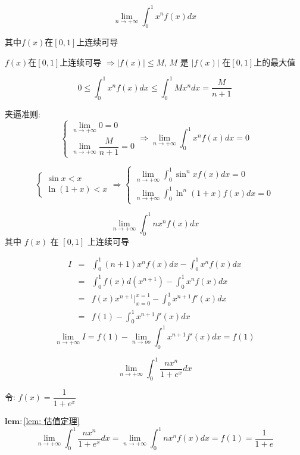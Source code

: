 \begin{lemma}[估值定理]\label{lem: 估值定理}
	
	$$\lim\limits_{n\to +\infty}\int_{0}^{1}x^nf(x)dx$$
	
	其中$f(x)$在$[0,1]$上连续可导
	

	$f(x)$在$[0,1]$上连续可导 $\Rightarrow |f(x)|\leq M$, $M$ 是 $|f(x)|$ 在$[0,1]$上的最大值

	$$0\leq\int_{0}^{1}x^nf(x)dx\leq\int_{0}^{1}Mx^ndx = \dfrac{M}{n+1}$$
	
	夹逼准则:
	$$\begin{cases}
	  \lim\limits_{n \to +\infty} 0 = 0\\
	  \lim\limits_{n \to +\infty}\dfrac{M}{n+1} = 0
	\end{cases}\Rightarrow \lim\limits_{n \to +\infty}\int_{0}^{1}x^nf(x)dx=0$$ 
	
	$$\begin{cases}
	  \sin x < x\\
	  \ln(1+x) < x
	\end{cases}\Rightarrow
	\begin{cases}
	  \lim\limits_{n \to +\infty}\int_{0}^{1}\sin ^{n}xf(x)dx=0 \\
	  \lim\limits_{n \to +\infty}\int_{0}^{1}\ln^{n}(1+x)f(x)dx=0 
	\end{cases}$$

	$$\lim\limits_{n\to +\infty}\int_{0}^{1}nx^nf(x)dx$$
	 其中 $f(x)$ 在 $[0,1]$ 上连续可导

	\begin{eqnarray*}
		I & = & \int_{0}^{1}(n+1)x^{n}f(x)dx - \int_{0}^{1}x^nf(x)dx\\
		  & = & \int_{0}^{1}f(x)d(x^{n+1}) - \int_{0}^{1}x^nf(x)dx\\
		  & = & f(x)x^{n+1}\big|_{x=0}^{x=1} - \int_{0}^{1}x^{n+1}f'(x)dx\\
		  & = & f(1) - \int_{0}^{1}x^{n+1}f'(x)dx
	\end{eqnarray*}
	$$\lim\limits_{n \to +\infty}I = f(1) - \lim\limits_{n \to oo}\int_{0}^{1}x^{n+1}f'(x)dx = f(1)$$
\end{lemma}

\begin{example}[][Exam: 29.3.13]
	$$\lim\limits_{n\to +\infty}\int_{0}^{1}\dfrac{nx^n}{1+e^x}dx$$
\end{example}

\begin{solution}
	
	令: $f(x)=\dfrac{1}{1+e^x}$
	
	$\mathbf{lem: }$\ref{lem: 估值定理}
	$$\lim\limits_{n\to +\infty}\int_{0}^{1}\dfrac{nx^n}{1+e^x}dx = \lim\limits_{n\to +\infty}\int_{0}^{1}nx^{n}f(x)dx = 
	 f(1) = \dfrac{1}{1+e}$$
\end{solution}

